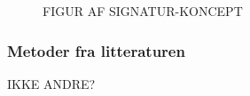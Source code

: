 \begin{figure}[htp]
  \centering
  \caption{FIGUR AF SIGNATUR-KONCEPT}
  \label{fig:ptv-signatur}
\end{figure}

\subsubsection{Metoder fra litteraturen}

IKKE ANDRE?


